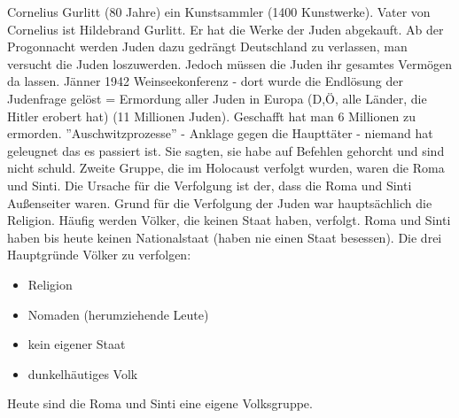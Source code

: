 \documentclass[a4paper,final]{book}
\begin{document}
\newline
\newline
Cornelius Gurlitt (80 Jahre) ein Kunstsammler (1400 Kunstwerke). Vater von Cornelius ist Hildebrand Gurlitt. Er hat die Werke der Juden abgekauft.
\newline
\newline
Ab der Progonnacht werden Juden dazu gedrängt Deutschland zu verlassen, man versucht die Juden loszuwerden. Jedoch müssen die Juden ihr gesamtes Vermögen da lassen.
\newline
\newline
Jänner 1942 Weinseekonferenz - dort wurde die Endlösung der Judenfrage gelöst = Ermordung aller Juden in Europa (D,Ö, alle Länder, die Hitler erobert hat) (11 Millionen Juden). Geschafft hat man 6 Millionen zu ermorden.
\newline
{} ''Auschwitzprozesse'' - Anklage gegen die Haupttäter - niemand hat geleugnet das es passiert ist. Sie sagten, sie habe auf Befehlen gehorcht und sind nicht schuld.
\newline
\newline
Zweite Gruppe, die im Holocaust verfolgt wurden, waren die Roma und Sinti. Die Ursache für die Verfolgung ist der, dass die Roma und Sinti Außenseiter waren. Grund für die Verfolgung der Juden war hauptsächlich die Religion. Häufig werden Völker, die keinen Staat haben, verfolgt. Roma und Sinti haben bis heute keinen Nationalstaat (haben nie einen Staat besessen).
\newline
\newline
Die drei Hauptgründe Völker zu verfolgen:
\begin{itemize}
\item Religion
\item Nomaden (herumziehende Leute)
\item kein eigener Staat
\item dunkelhäutiges Volk
\end{itemize}

Heute sind die Roma und Sinti eine eigene Volksgruppe.
\end{document}

